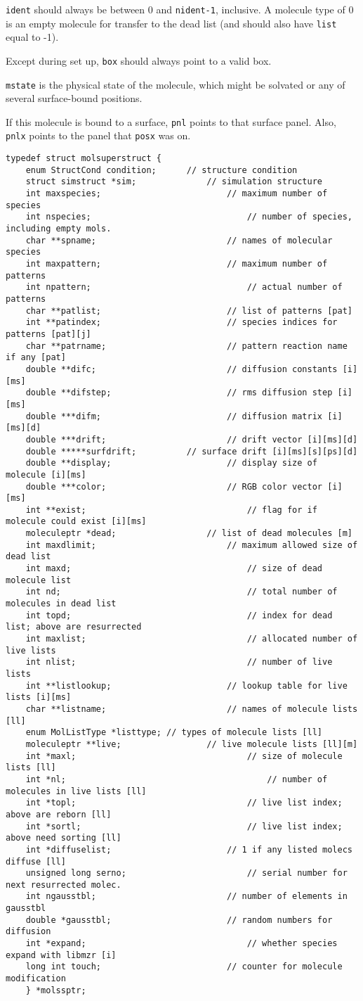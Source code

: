\documentclass {book}
\begin{document}
\texttt{ident} should always be between 0 and \texttt{nident-1}, inclusive. A molecule type of 0 is an empty molecule for transfer to the dead list (and should also have \texttt{list} equal to -1).

Except during set up, \texttt{box} should always point to a valid box.

\texttt{mstate} is the physical state of the molecule, which might be solvated or any of several surface-bound positions.

If this molecule is bound to a surface, \texttt{pnl} points to that surface panel.  Also, \texttt{pnlx} points to the panel that \texttt{posx} was on.

\begin{lstlisting}
typedef struct molsuperstruct {
	enum StructCond condition;		// structure condition
	struct simstruct *sim;				// simulation structure
	int maxspecies;							// maximum number of species
	int nspecies;								// number of species, including empty mols.
	char **spname;							// names of molecular species
	int maxpattern;							// maximum number of patterns
	int npattern;								// actual number of patterns
	char **patlist;							// list of patterns [pat]
	int **patindex;							// species indices for patterns [pat][j]
	char **patrname;						// pattern reaction name if any [pat]
	double **difc;							// diffusion constants [i][ms]
	double **difstep;						// rms diffusion step [i][ms]
	double ***difm;							// diffusion matrix [i][ms][d]
	double ***drift;						// drift vector [i][ms][d]
	double *****surfdrift;			// surface drift [i][ms][s][ps][d]
	double **display;						// display size of molecule [i][ms] 
	double ***color;						// RGB color vector [i][ms]
	int **exist;								// flag for if molecule could exist [i][ms]
	moleculeptr *dead;					// list of dead molecules [m]
	int maxdlimit;							// maximum allowed size of dead list
	int maxd;									// size of dead molecule list
	int nd;										// total number of molecules in dead list
	int topd;									// index for dead list; above are resurrected
	int maxlist;								// allocated number of live lists
	int nlist;									// number of live lists
	int **listlookup;						// lookup table for live lists [i][ms]
	char **listname;						// names of molecule lists [ll]
	enum MolListType *listtype;	// types of molecule lists [ll]
	moleculeptr **live;					// live molecule lists [ll][m]
	int *maxl;									// size of molecule lists [ll]
	int *nl;										// number of molecules in live lists [ll]
	int *topl;									// live list index; above are reborn [ll]
	int *sortl;									// live list index; above need sorting [ll]
	int *diffuselist;						// 1 if any listed molecs diffuse [ll]
	unsigned long serno;						// serial number for next resurrected molec.
	int ngausstbl;							// number of elements in gausstbl
	double *gausstbl;						// random numbers for diffusion
	int *expand;								// whether species expand with libmzr [i]
	long int touch;							// counter for molecule modification
	} *molssptr;
\end{lstlisting}
\end{document}
